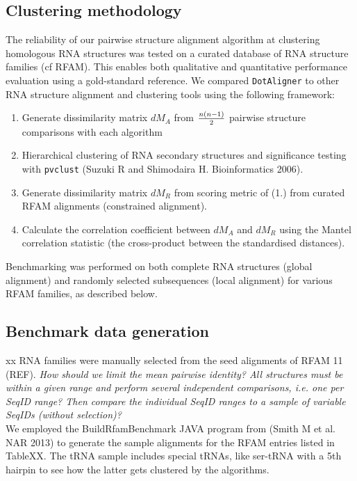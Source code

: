 \documentclass[a4paper,twoside]{article}
\newcommand\pvclust{\texttt{pvclust}}
\begin{document}
\subsection{Clustering methodology} 

\noindent The reliability of our pairwise structure alignment algorithm at
clustering homologous RNA structures was tested on a curated database of RNA
structure families (cf RFAM). This enables both qualitative and quantitative
performance evaluation using a gold-standard reference. We compared
\texttt{DotAligner} to other RNA structure alignment and clustering tools using
the following framework: 

\begin{enumerate}
\item Generate dissimilarity matrix $dM_A$ from ${n(n-1)}\over{2}$ pairwise structure comparisons with each algorithm
\item Hierarchical clustering of RNA secondary structures and significance testing with \pvclust{} (Suzuki R and Shimodaira H. Bioinformatics 2006).
\item Generate dissimilarity matrix $dM_R$ from scoring metric of (1.) from curated RFAM alignments (constrained alignment). 
\item Calculate the correlation coefficient between $dM_A$ and $dM_R$ using the Mantel correlation statistic (the cross-product between the standardised distances). 
\end{enumerate}

Benchmarking was performed on both complete RNA structures (global alignment) and randomly selected subsequences (local alignment) for various RFAM families, as described below. \\


\subsection{Benchmark data generation} 

xx RNA families were manually selected from the seed alignments of RFAM 11 (REF). \textit{How should we limit the mean pairwise identity? All structures must be within a given range and perform several independent comparisons, i.e. one per SeqID range? Then compare the individual SeqID ranges to a sample of variable SeqIDs (without selection)?}\\

We employed the BuildRfamBenchmark JAVA program from (Smith M et al. NAR 2013) to generate the sample alignments for the RFAM entries listed in TableXX. The tRNA sample includes special tRNAs, like ser-tRNA with a 5th hairpin to see how the latter gets clustered by the algorithms. \\
\end{document}
